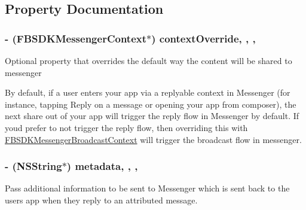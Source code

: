 \subsection{Property Documentation}
\hypertarget{interface_f_b_s_d_k_messenger_share_options_af5f9ad68d2865fc8c803a6cf44c28a7a}{}
\subsubsection[{context\+Override}]{\setlength{\rightskip}{0pt plus 5cm}-\/ ({\bf F\+B\+S\+D\+K\+Messenger\+Context}$\ast$) context\+Override\hspace{0.3cm}{\ttfamily [read]}, {\ttfamily [write]}, {\ttfamily [nonatomic]}, {\ttfamily [strong]}}\label{interface_f_b_s_d_k_messenger_share_options_af5f9ad68d2865fc8c803a6cf44c28a7a}
Optional property that overrides the default way the content will be shared to messenger

By default, if a user enters your app via a replyable context in Messenger (for instance, tapping Reply on a message or opening your app from composer), the next share out of your app will trigger the reply flow in Messenger by default. If you\textquotesingle{}d prefer to not trigger the reply flow, then overriding this with \hyperlink{interface_f_b_s_d_k_messenger_broadcast_context}{F\+B\+S\+D\+K\+Messenger\+Broadcast\+Context} will trigger the broadcast flow in messenger. \hypertarget{interface_f_b_s_d_k_messenger_share_options_a1c26e89d9a84686394c45bafc2fbf91e}{}
\subsubsection[{metadata}]{\setlength{\rightskip}{0pt plus 5cm}-\/ (N\+S\+String$\ast$) metadata\hspace{0.3cm}{\ttfamily [read]}, {\ttfamily [write]}, {\ttfamily [nonatomic]}, {\ttfamily [copy]}}\label{interface_f_b_s_d_k_messenger_share_options_a1c26e89d9a84686394c45bafc2fbf91e}
Pass additional information to be sent to Messenger which is sent back to the user\textquotesingle{}s app when they reply to an attributed message. \hypertarget{interface_f_b_s_d_k_messenger_share_options_ab5153d3741ffa03d1222db0df759275d}{}
